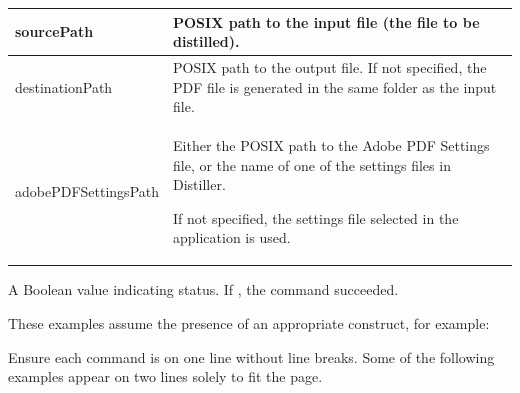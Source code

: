 \documentclass[letterpaper,12pt,english,openany,oneside]{sphinxmanual}
\begin{document}


\begin{savenotes}\sphinxattablestart
\centering
{}\label{\detokenize{Distiller_Mac:section-1}}\nobreak
\begin{tabulary}{\linewidth}[t]{|T|T|}
\hline

sourcePath
&
POSIX path to the input file (the file to be distilled).
\\
\hline
destinationPath
&
POSIX path to the output file. If not specified, the PDF file is generated in the same folder as the input file.
\\
\hline
adobePDFSettingsPath
&
Either the POSIX path to the Adobe PDF Settings file, or the name of one of the settings files in Distiller.

If not specified, the settings file selected in the application is used.
\\
\hline
\end{tabulary}
\par
\sphinxattableend\end{savenotes}


A Boolean value indicating status. If  , the command succeeded.


These examples assume the presence of an appropriate  construct, for example:

\begin{sphinxVerbatim}[commandchars=\\\{\}]
  
         \PYG{p}{[} \PYG{p}{]}
  
\end{sphinxVerbatim}

Ensure each command is on one line without line breaks. Some of the following examples appear on two lines solely to fit the page.

\begin{sphinxVerbatim}[commandchars=\\\{\}]
  
    
           
    
            
\end{sphinxVerbatim}
\end{document}
